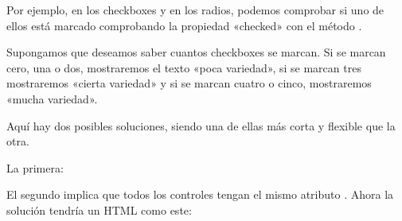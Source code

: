 \documentclass[letterpaper,10pt,spanish]{sphinxmanual}
\begin{document}
Por ejemplo, en los checkboxes y en los radios, podemos comprobar si uno de ellos está marcado comprobando la propiedad «checked» con el método .

Supongamos que deseamos saber cuantos checkboxes se marcan. Si se marcan cero, una o dos, mostraremos el texto «poca variedad», si se marcan tres mostraremos «cierta variedad» y si se marcan cuatro o cinco, mostraremos «mucha variedad».

Aquí hay dos posibles soluciones, siendo una de ellas  más corta y flexible que la otra.

La primera:

\begin{sphinxVerbatim}[commandchars=\\\{\}]
 
   

 
   

 
   

 
   

 
   

     
\end{sphinxVerbatim}

El segundo implica que todos los controles tengan el mismo atributo . Ahora la solución tendría un HTML como este:
\end{document}
